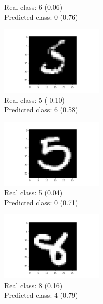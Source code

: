 \documentclass[a4paper]{article}    %
\begin{document}
\begin{figure}[H]
\begin{subfigure}{0.32\textwidth}
        \caption{
            Real class: 6 (0.06)\\
            Predicted class: 0 (0.76)}
        \label{fig:example_4}
    \end{subfigure}
    \hfill
    \begin{subfigure}{0.32\textwidth}
        \centering
        \includegraphics[width=5.0cm]{14}
        \caption{
            Real class: 5 (-0.10)\\
            Predicted class: 6 (0.58)}
        \label{fig:example_5}
    \end{subfigure}
    \hfill
    \begin{subfigure}{0.32\textwidth}
        \centering
        \includegraphics[width=5.0cm]{17}
        \caption{
            Real class: 5 (0.04)\\
            Predicted class: 0 (0.71)}
        \label{fig:example_6}
    \end{subfigure}
    \hfill
    \begin{subfigure}{0.32\textwidth}
        \centering
        \includegraphics[width=5.0cm]{19}
        \caption{
            Real class: 8 (0.16)\\
            Predicted class: 4 (0.79)}
        \label{fig:example_7}
    \end{subfigure}
    \hfill
    \begin{subfigure}{0.32\textwidth}
        \centering

\end{subfigure}
\end{figure}
\end{document}
